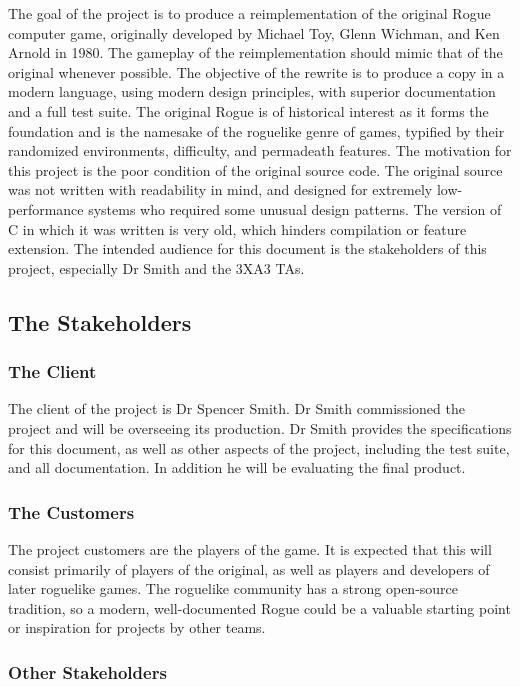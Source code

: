 \documentclass[12pt, titlepage]{article}
\begin{document}
	The goal of the project is to produce a reimplementation of the original Rogue computer game, originally developed by Michael Toy, Glenn Wichman, and Ken Arnold in 1980. The gameplay of the reimplementation should mimic that of the original whenever possible. The objective of the rewrite is to produce a copy in a modern language, using modern design principles, with superior documentation and a full test suite. The original Rogue is of historical interest as it forms the foundation and is the namesake of the roguelike genre of games, typified by their randomized environments, difficulty, and permadeath features. The motivation for this project is the poor condition of the original source code. The original source was not written with readability in mind, and designed for extremely low-performance systems who required some unusual design patterns. The version of C in which it was written is very old, which hinders compilation or feature extension. The intended audience for this document is the stakeholders of this project, especially Dr Smith and the 3XA3 TAs.

	\subsection{The Stakeholders}

		\subsubsection{The Client}

		The client of the project is Dr Spencer Smith. Dr Smith commissioned the project and will be overseeing its production. Dr Smith provides the specifications for this document, as well as other aspects of the project, including the test suite, and all documentation. In addition he will be evaluating the final product.

		\subsubsection{The Customers}

		The project customers are the players of the game. It is expected that this will consist primarily of players of the original, as well as players and developers of later roguelike games. The roguelike community has a strong open-source tradition, so a modern, well-documented Rogue could be a valuable starting point or inspiration for projects by other teams.

		\subsubsection{Other Stakeholders}
\end{document}
